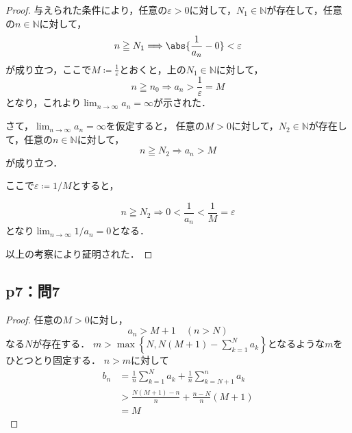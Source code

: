 \documentclass[uplatex,dvipdfmx,a4paper,10pt,fleqn]{jsarticle}
\begin{document}
    \begin{tleftbar}
        \begin{proof}
            与えられた条件により，任意の$\varepsilon>0$に対して，$N_1 \in \mathbb{N}$が存在して，任意の$n \in \mathbb{N}$に対して，
    \[
        n \geqq N_1 \Longrightarrow \abs{\frac{1}{a_n}-0}<\varepsilon
    \]
    が成り立つ，ここで$M \coloneqq \frac{1}{\varepsilon}$とおくと，上の$N_1 \in \mathbb{N}$に対して，
    \[
        n \geqq n_0 \Longrightarrow a_n  >\frac{1}{\varepsilon}=M
    \]
    となり，これより$\lim_{n \to \infty} a_n=\infty$が示された．

    さて，$\lim_{n \to \infty} a_n = \infty$を仮定すると，
        任意の$M>0$に対して，$N_2 \in \mathbb{N}$が存在して，任意の$n \in \mathbb{N}$に対して，
        \[
            n \geqq N_2 \Longrightarrow a_n > M
        \]
        が成り立つ．

        ここで$\varepsilon \coloneqq  1/M$とすると，

        \[
            n \geqq N_2 \Longrightarrow 0< \frac{1}{a_n} < \frac{1}{M}= \varepsilon 
        \]
        となり$\lim_{n \to \infty} 1/a_n = 0$となる．
        
        以上の考察により証明された．
        \end{proof}
        \end{tleftbar}

        \subsection*{p7：問7}
    
\begin{leftbar} \begin{proof}
    任意の$M > 0$に対し，
    \[
      a_n > M + 1 \quad (n > N)
    \]
    なる$N$が存在する．
    $m > \max \left\{ N, N(M + 1) - \sum_{k = 1}^N a_k \right\}$となるような$m$をひとつとり固定する．
    $n > m$に対して
    \begin{align*}
      b_n
      &= \frac{1}{n} \sum_{k = 1}^N a_k + \frac{1}{n} \sum_{k = N + 1}^n a_k \\
      &> \frac{N(M + 1) - n}{n} + \frac{n - N}{n} (M + 1) \\
      &= M
    \end{align*}
  \end{proof}
\end{leftbar}
  
  \newpage
 
\end{document}
